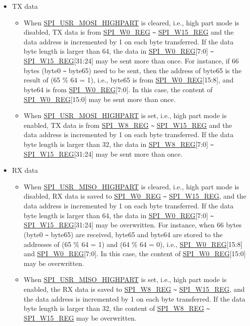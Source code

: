 \documentclass[main\_\_EN.tex]{subfiles}
\begin{document}
\begin{itemize}
    \item TX data
    \begin{itemize}
        \item When \hyperref[fielddesc:SPIUSRMOSIHIGHPART]{SPI\_USR\_MOSI\_HIGHPART} is cleared, i.e., high part mode is disabled, TX data is from \hyperref[regdesc:SPIW0REG]{SPI\_W0\_REG} \verb+~+ \hyperref[regdesc:SPIW15REG]{SPI\_W15\_REG} and the data address is incremented by 1 on each byte transferred. If the data byte length is larger than 64, the data in \hyperref[regdesc:SPIW0REG]{SPI\_W0\_REG}[7:0] \verb+~+ \hyperref[regdesc:SPIW15REG]{SPI\_W15\_REG}[31:24] may be sent more than once. For instance, if 66 bytes (byte0 \verb+~+ byte65) need to be sent, then the address of byte65 is the result of (65 \% 64 = 1), i.e., byte65 is from \hyperref[regdesc:SPIW0REG]{SPI\_W0\_REG}[15:8], and byte64 is from \hyperref[regdesc:SPIW0REG]{SPI\_W0\_REG}[7:0]. In this case, the content of \hyperref[regdesc:SPIW0REG]{SPI\_W0\_REG}[15:0] may be sent more than once.
        \item When \hyperref[fielddesc:SPIUSRMOSIHIGHPART]{SPI\_USR\_MOSI\_HIGHPART} is set, i.e., high part mode is enabled, TX data is from \hyperref[regdesc:SPIW8REG]{SPI\_W8\_REG} \verb+~+ \hyperref[regdesc:SPIW15REG]{SPI\_W15\_REG} and the data address is incremented by 1 on each byte transferred. If the data byte length is larger than 32, the data in \hyperref[regdesc:SPIW8REG]{SPI\_W8\_REG}[7:0] \verb+~+ \hyperref[regdesc:SPIW15REG]{SPI\_W15\_REG}[31:24] may be sent more than once.
    \end{itemize}
    \item RX data
    \begin{itemize}
        \item When \hyperref[fielddesc:SPIUSRMISOHIGHPART]{SPI\_USR\_MISO\_HIGHPART} is cleared, i.e., high part mode is disabled, RX data is saved to \hyperref[regdesc:SPIW0REG]{SPI\_W0\_REG} \verb+~+ \hyperref[regdesc:SPIW15REG]{SPI\_W15\_REG}, and the data address is incremented by 1 on each byte transferred. If the data byte length is larger than 64, the data in \hyperref[regdesc:SPIW0REG]{SPI\_W0\_REG}[7:0] \verb+~+ \hyperref[regdesc:SPIW15REG]{SPI\_W15\_REG}[31:24] may be overwritten. For instance, when 66 bytes (byte0 \verb+~+ byte65) are received, byte65 and byte64 are stored to the addresses of (65 \% 64 = 1) and (64 \% 64 = 0), i.e., \hyperref[regdesc:SPIW0REG]{SPI\_W0\_REG}[15:8] and \hyperref[regdesc:SPIW0REG]{SPI\_W0\_REG}[7:0]. In this case, the content of \hyperref[regdesc:SPIW0REG]{SPI\_W0\_REG}[15:0] may be overwritten.

        \item When \hyperref[fielddesc:SPIUSRMISOHIGHPART]{SPI\_USR\_MISO\_HIGHPART} is set, i.e., high part mode is enabled, the RX data is saved to \hyperref[regdesc:SPIW8REG]{SPI\_W8\_REG} \verb+~+ \hyperref[regdesc:SPIW15REG]{SPI\_W15\_REG}, and the data address is incremented by 1 on each byte transferred. If the data byte length is larger than 32, the content of \hyperref[regdesc:SPIW8REG]{SPI\_W8\_REG} \verb+~+ \hyperref[regdesc:SPIW15REG]{SPI\_W15\_REG} may be overwritten.
    \end{itemize}
\end{itemize}
\end{document}

